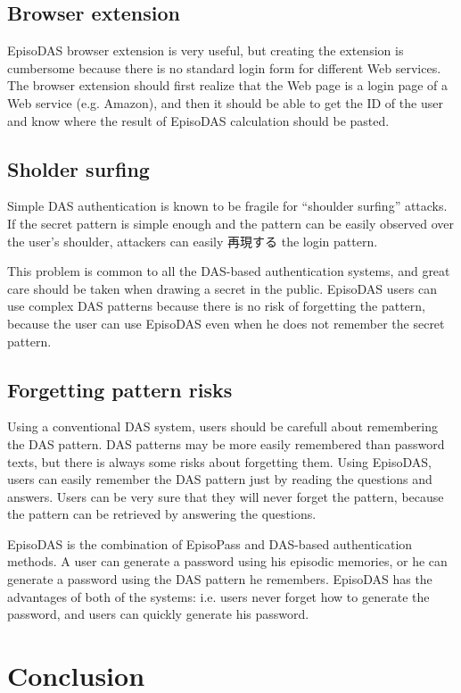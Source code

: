 \documentclass[sigconf]{acmart}
\begin{document}
\subsection{Browser extension}

EpisoDAS browser extension is very useful, but creating the extension
is cumbersome because there is no standard login form for
different Web services.
%
The browser extension should first realize that the Web page is a login page
of a Web service (e.g. Amazon),
and then it should be able to get the ID of the user
and know where the result of EpisoDAS calculation should be pasted.

\subsection{Sholder surfing}

Simple DAS authentication is known to be fragile for ``shoulder surfing''
attacks\cite{Aviv:2017:TBS:3134600.3134609}.
If the secret pattern is simple enough and
the pattern can be easily observed over the user's shoulder,
attackers can easily 再現する the login pattern.

This problem is common to all the DAS-based authentication systems,
and great care should be taken when drawing a secret in the public.
EpisoDAS users can use complex DAS patterns
because there is no risk of forgetting the pattern,
because the user can use EpisoDAS even when he does not remember the
secret pattern.

\subsection{Forgetting pattern risks}

Using a conventional DAS system, users should be carefull about
remembering the DAS pattern.
DAS patterns may be more easily remembered than password texts,
but there is always some risks about forgetting them.
Using EpisoDAS, users can easily remember the DAS pattern
just by reading the questions and answers.
Users can be very sure that they will never forget the pattern,
because the pattern can be retrieved by answering the questions.

EpisoDAS is the combination of EpisoPass and DAS-based authentication methods.
A user can generate a password using his episodic memories, or
he can generate a password using the DAS pattern he remembers.
%
EpisoDAS has the advantages of both of the systems: i.e.
users never forget how to generate the password, and
users can quickly generate his password.

\section{Conclusion}



\end{document}
